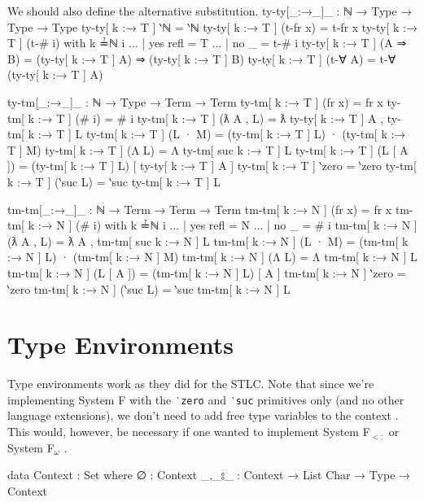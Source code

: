 \documentclass[logo,bsc,singlespacing,parskip,online]{infthesis}
\renewenvironment{code}{\mintedcopy[breaklines,breaksymbolleft=\;]{agda}}{\endmintedcopy}
\begin{document}
We should also define the alternative substitution.
\begin{code}
  ty-ty[_:→_]_ : ℕ → Type → Type → Type
  ty-ty[ k :→ T ] ‵ℕ = ‵ℕ
  ty-ty[ k :→ T ] (t-fr x) = t-fr x
  ty-ty[ k :→ T ] (t-# i) with k ≟ℕ i
  ... | yes refl = T
  ... | no  _    = t-# i
  ty-ty[ k :→ T ] (A ⇒ B) = (ty-ty[ k :→ T ] A) ⇒ (ty-ty[ k :→ T ] B)
  ty-ty[ k :→ T ] (t-∀ A) = t-∀ (ty-ty[ k :→ T ] A)

  ty-tm[_:→_]_ : ℕ → Type → Term → Term
  ty-tm[ k :→ T ] (fr x) = fr x
  ty-tm[ k :→ T ] (# i) = # i
  ty-tm[ k :→ T ] (ƛ A , L) = ƛ ty-ty[ k :→ T ] A , ty-tm[ k :→ T ] L
  ty-tm[ k :→ T ] (L · M) = (ty-tm[ k :→ T ] L) · (ty-tm[ k :→ T ] M)
  ty-tm[ k :→ T ] (Λ L) = Λ ty-tm[ suc k :→ T ] L
  ty-tm[ k :→ T ] (L [ A ]) = (ty-tm[ k :→ T ] L) [ ty-ty[ k :→ T ] A ]
  ty-tm[ k :→ T ] ‵zero = ‵zero
  ty-tm[ k :→ T ] (‵suc L) = ‵suc ty-tm[ k :→ T ] L

  tm-tm[_:→_]_ : ℕ → Term → Term → Term
  tm-tm[ k :→ N ] (fr x) = fr x
  tm-tm[ k :→ N ] (# i) with k ≟ℕ i
  ... | yes refl = N
  ... | no  _    = # i
  tm-tm[ k :→ N ] (ƛ A , L) = ƛ A , tm-tm[ suc k :→ N ] L
  tm-tm[ k :→ N ] (L · M) = (tm-tm[ k :→ N ] L) · (tm-tm[ k :→ N ] M)
  tm-tm[ k :→ N ] (Λ L) = Λ tm-tm[ k :→ N ] L
  tm-tm[ k :→ N ] (L [ A ]) = (tm-tm[ k :→ N ] L) [ A ]
  tm-tm[ k :→ N ] ‵zero = ‵zero
  tm-tm[ k :→ N ] (‵suc L) = ‵suc tm-tm[ k :→ N ] L
\end{code}

\section{Type Environments}
Type environments work as they did for the STLC. Note that since we're implementing System F with
the \texttt{‵zero} and \texttt{‵suc} primitives only (and no other language extensions), we don't
need to add free type variables to the context \citep{pierce_types_2002}. This would, however, be
necessary if one wanted to implement System F$_{<:}$ \citep{chargueraud_locally_2012} or System
F$_{\omega}$ \citep{hutton_system_2019}.

\begin{code}
  data Context : Set where
    ∅ : Context
    _,_⦂_ : Context → List Char → Type → Context
\end{code}
\end{document}
